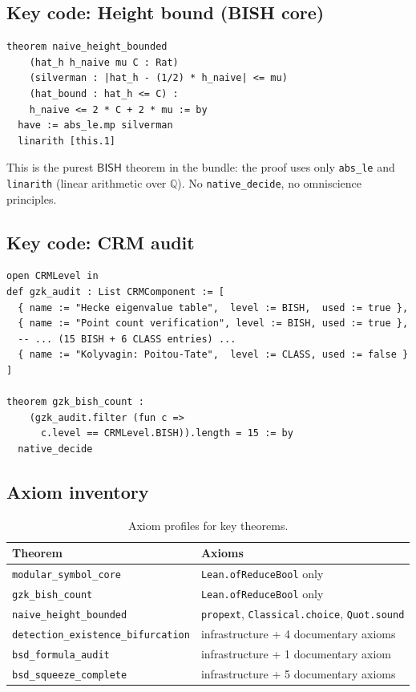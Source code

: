 \documentclass[11pt]{article}
\theoremstyle{plain}
\theoremstyle{definition}
\theoremstyle{remark}
\newcommand{\Q}{\mathbb{Q}}
\newcommand{\BISH}{\ensuremath{\mathsf{BISH}}}
\begin{document}
\subsection{Key code: Height bound (BISH core)}

\begin{lstlisting}[style=leanstyle,caption={The BISH core theorem (HeegnerData.lean).}]
theorem naive_height_bounded
    (hat_h h_naive mu C : Rat)
    (silverman : |hat_h - (1/2) * h_naive| <= mu)
    (hat_bound : hat_h <= C) :
    h_naive <= 2 * C + 2 * mu := by
  have := abs_le.mp silverman
  linarith [this.1]
\end{lstlisting}

This is the purest $\BISH$ theorem in the bundle: the proof uses only \texttt{abs\_le} and \texttt{linarith} (linear arithmetic over $\Q$). No \texttt{native\_decide}, no omniscience principles.

\subsection{Key code: CRM audit}

\begin{lstlisting}[style=leanstyle,caption={Theorem B: GZK decomposition (Paper95\_BSDSqueeze.lean).}]
open CRMLevel in
def gzk_audit : List CRMComponent := [
  { name := "Hecke eigenvalue table",  level := BISH,  used := true },
  { name := "Point count verification", level := BISH, used := true },
  -- ... (15 BISH + 6 CLASS entries) ...
  { name := "Kolyvagin: Poitou-Tate",  level := CLASS, used := false }
]

theorem gzk_bish_count :
    (gzk_audit.filter (fun c =>
      c.level == CRMLevel.BISH)).length = 15 := by
  native_decide
\end{lstlisting}

\subsection{Axiom inventory}

\begin{table}[ht]
\centering
\caption{Axiom profiles for key theorems.}\label{tab:axioms}
\begin{tabular}{l l}
\toprule
\textbf{Theorem} & \textbf{Axioms} \\
\midrule
\texttt{modular\_symbol\_core} & \texttt{Lean.ofReduceBool} only \\
\texttt{gzk\_bish\_count} & \texttt{Lean.ofReduceBool} only \\
\texttt{naive\_height\_bounded} & \texttt{propext}, \texttt{Classical.choice}, \texttt{Quot.sound} \\
\texttt{detection\_existence\_bifurcation} & infrastructure + 4 documentary axioms \\
\texttt{bsd\_formula\_audit} & infrastructure + 1 documentary axiom \\
\texttt{bsd\_squeeze\_complete} & infrastructure + 5 documentary axioms \\
\bottomrule
\end{tabular}
\end{table}
\end{document}

